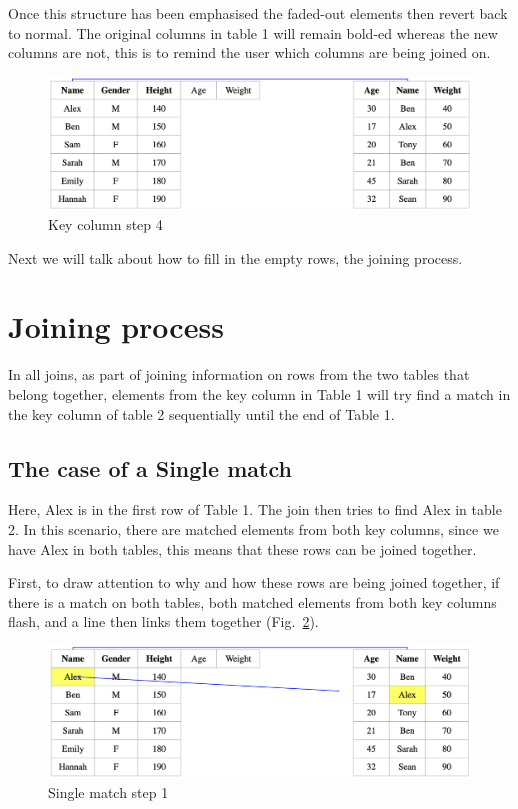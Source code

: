 Once this structure has been emphasised the faded-out elements then revert back to normal. The original columns in table 1 will remain bold-ed whereas the new columns are not, this is to remind the user which columns are being joined on.

\begin{figure}[H]
    \includegraphics[scale = 0.25]{Masters-Thesis/img/keycol4.png}
    \caption{Key column step 4}
    \label{fig:keycol4}
\end{figure}

Next we will talk about how to fill in the empty rows, the joining process.

\section{Joining process}
In all joins, as part of joining information on rows from the two tables that belong together, elements from the key column in Table 1 will try find a match in the key column of table 2 sequentially until the end of Table 1.

\subsection{The case of a Single match}
Here, Alex is in the first row of Table 1. The join then tries to find Alex in table 2. 
In this scenario, there are matched elements from both key columns, since we have Alex in both tables, this means that these rows can be joined together. 

First, to draw attention to why and how these rows are being joined together, if there is a match on both tables, both matched elements from both key columns flash, and a line then links them together (Fig.~\ref{fig:single1}). 

\begin{figure}[H]
    \includegraphics[scale = 0.25]{Masters-Thesis/img/single1.png}
    \caption{Single match step 1}
    \label{fig:single1}
\end{figure}

